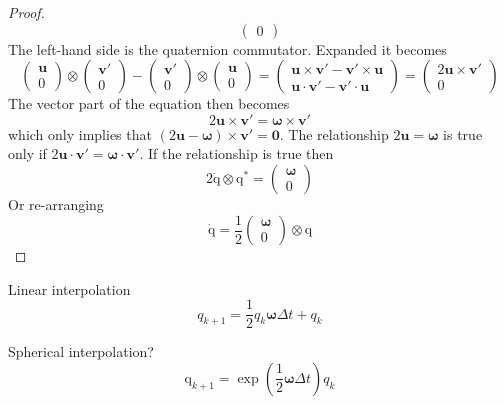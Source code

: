 \documentclass{amsart}
\theoremstyle{definition}
\theoremstyle{remark}
\numberwithin{equation}{section}
\begin{document}
\begin{proof}
\begin{equation}
\begin{pmatrix}
      0
    \end{pmatrix}
  \end{equation}
  The left-hand side is the quaternion commutator. Expanded it becomes
  \begin{equation}
    \begin{pmatrix}
      \mathbf{u} \\
      0
    \end{pmatrix}
    \otimes
    \begin{pmatrix}
      \mathbf{v}'\\
      0
    \end{pmatrix}
    -
    \begin{pmatrix}
      \mathbf{v}'\\
      0
    \end{pmatrix}
    \otimes
    \begin{pmatrix}
      \mathbf{u}\\
      0
    \end{pmatrix}
    =
    \begin{pmatrix}
      \mathbf{u}\times\mathbf{v}'-\mathbf{v}'\times\mathbf{u} \\
      \mathbf{u}\cdot\mathbf{v}'-\mathbf{v}'\cdot\mathbf{u}
    \end{pmatrix}
    =
    \begin{pmatrix}
      2\mathbf{u}\times\mathbf{v}'\\
      0
    \end{pmatrix}
  \end{equation}
  The vector part of the equation then becomes
  \begin{equation}
    2\mathbf{u}\times\mathbf{v}' = \boldsymbol\omega\times\mathbf{v}'
  \end{equation}
  which only implies that $(2\mathbf{u}-\boldsymbol\omega)\times\mathbf{v}' = \mathbf{0}$.
  The relationship $2\mathbf{u}=\boldsymbol\omega$ is true only if $2\mathbf{u}\cdot\mathbf{v}'=\boldsymbol\omega\cdot\mathbf{v}'$.
  If the relationship is true then
  \begin{equation}
    2\mathrm{\dot{q}}\otimes\mathrm{q^*} =
    \begin{pmatrix}
      \boldsymbol\omega \\
      0
    \end{pmatrix}
  \end{equation}
  Or re-arranging
  \begin{equation}
    \mathrm{\dot{q}} = \frac{1}{2}
    \begin{pmatrix}
      \boldsymbol\omega \\
      0
    \end{pmatrix}
    \otimes \mathrm{q}
  \end{equation}
\end{proof}

Linear interpolation
\begin{equation}
  q_{k+1} = \frac{1}{2}q_k\boldsymbol\omega\Delta t + q_k 
\end{equation}

Spherical interpolation?
\begin{equation}
  \mathrm{q}_{k+1} = \exp\left(\frac{1}{2} \boldsymbol\omega\Delta t\right)q_k
\end{equation}
\end{document}
